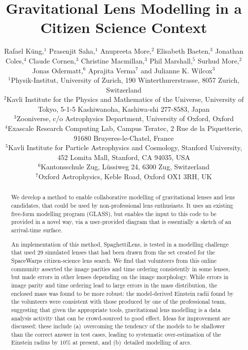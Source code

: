 \documentclass[usenatbib]{mn2e}
\newcommand{\spl}{SpaghettiLens\xspace}
\newcommand{\sw}{SpaceWarps\xspace}
\begin{document}
\title{Gravitational Lens Modelling in a Citizen Science Context}

\author[Küng et al]{Rafael Küng,$^{1}$
Prasenjit Saha,$^{1}$
Anupreeta More,$^{2}$
Elisabeth Baeten,$^{3}$
\newauthor
Jonathan Coles,$^{4}$
Claude Cornen,$^{3}$
Christine Macmillan,$^{3}$
Phil Marshall,$^{5}$ 
\newauthor
Surhud More,$^{2}$
Jonas Odermatt,$^{6}$
Aprajita Verma$^{7}$
and Julianne K. Wilcox$^{3}$
%
\\
%
$^{1}$Physik-Institut, University of Zurich, 190 Winterthurerstrasse, 8057 Zurich, Switzerland\\
$^{2}$Kavli Institute for the Physics and Mathematics of the Universe, University of Tokyo, 5-1-5 Kashiwanoha, Kashiwa-shi 277-8583, Japan\\
$^{3}$Zooniverse, c/o Astrophysics Department, University of Oxford, Oxford \\
$^{4}$Exascale Research Computing Lab, Campus Teratec, 2 Rue de la Piquetterie, 91680 Bruyeres-le-Chatel, France\\
$^{5}$Kavli Institute for Particle Astrophysics and Cosmology, Stanford University, 452 Lomita Mall, Stanford, CA 94035, USA\\
$^{6}$Kantonsschule Zug, L\"ussiweg 24, 6300 Zug, Switzerland\\
$^{7}$Oxford Astrophysics, Keble Road, Oxford OX1 3RH, UK\\
}

\maketitle

\begin{abstract}

We develop a method to enable collaborative modelling of
gravitational lenses and lens candidates, that could be used by
non-professional lens enthusiasts.  It uses an existing free-form
modelling program (GLASS), but enables the input to this code to be
provided in a novel way, via a user-provided diagram that is
essentially a sketch of an arrival-time surface.

An implementation of this method, \spl, is tested in a modelling
challenge that used 29 simulated lenses that had been drawn from the
set created for the \sw citizen-science lens search.  We find that
volunteers from this online community asserted the image parities and
time ordering consistently in some lenses, but made errors in other
lenses depending on the image morphology. While errors in image parity
and time ordering lead to large errors in the mass distribution, the
enclosed mass was found to be more robust: the model-derived Einstein
radii found by the volunteers were consistent with those produced by
one of the professional team, suggesting that given the appropriate
tools, gravitational lens modelling is a data analysis activity that
can be crowd-sourced to good effect. Ideas for improvement are
discussed; these include (a)~overcoming the tendency of the models to
be shallower than the correct answer in test cases, leading to
systematic over-estimation of the Einstein radius by 10\% at present,
and (b)~detailed modelling of arcs.

\end{abstract}
\end{document}
